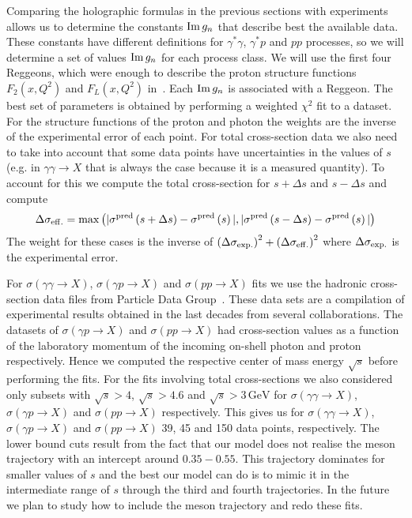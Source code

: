 \documentclass[preprint, 12pt]{elsarticle}
\begin{document}
Comparing the holographic formulas in the previous sections with experiments allows us to determine the constants ${\rm Im} \, g_n$ that describe best the available data. These constants have different definitions for $\gamma^*\gamma$, $\gamma^*p$ and $pp$ processes, so we will determine a set of values ${\rm Im} \, g_n$ for each process class. We will use the first four Reggeons, which were enough to describe the proton structure functions $F_2\left(x, Q^2\right)$ and $F_L\left(x, Q^2\right)$ in~\cite{gluonPDF_IHQCD_2020}. Each ${\rm Im} \, g_n$ is associated with a Reggeon. The best set of parameters is obtained by performing a weighted $\chi^2$ fit to a dataset. For the structure functions of the proton and photon the weights are the inverse of the experimental error of each point. For total cross-section data we also need to take into account that some data points have uncertainties in the values of $s$ (e.g. in $\gamma \gamma \rightarrow X$ that is always the case because it is a measured quantity). To account for this we compute the total cross-section for $s + \Delta s$ and $s - \Delta s$ and compute
\begin{equation}
\Delta \sigma_{\rm eff.} = {\rm max} \left(|\sigma^{\rm pred}\left(s + \Delta s\right)-\sigma^{\rm pred}\left(s\right)|,|\sigma^{\rm pred}\left(s - \Delta s\right)-\sigma^{\rm pred}\left(s\right)| \right)
\end{equation}
The weight for these cases is the inverse of ${\left(\Delta \sigma_{\rm exp.}\right)}^2+{\left(\Delta \sigma_{\rm eff.}\right)} ^2$ where $\Delta \sigma_{\rm exp.}$ is the experimental error.

For $\sigma\left(\gamma \gamma \rightarrow X\right)$,  $\sigma\left(\gamma p \rightarrow X\right)$ and $\sigma\left(p p \rightarrow X\right)$  fits we use the hadronic cross-section data files from Particle Data Group~\cite{pdg_2018}. These data sets are a compilation of experimental results obtained in the last decades from several collaborations. The datasets of  $\sigma\left(\gamma p \rightarrow X\right)$ and $\sigma\left(p p \rightarrow X\right)$ had cross-section values as a function of the laboratory momentum of the incoming on-shell photon and proton respectively. Hence we computed the respective center of mass energy $\sqrt{s}$ before performing the fits. For the fits involving total cross-sections we also considered only subsets with $\sqrt{s} > 4$, $\sqrt{s} > 4.6$ and $\sqrt{s} > 3 \, \text{GeV}$ for $\sigma\left(\gamma \gamma \rightarrow X\right)$, $\sigma\left(\gamma p \rightarrow X\right)$ and $\sigma\left(p p \rightarrow X \right)$ respectively. This gives us for $\sigma\left(\gamma \gamma \rightarrow X\right)$, $\sigma\left(\gamma p \rightarrow X\right)$ and $\sigma\left(p p \rightarrow X \right)$ 39, 45 and 150 data points, respectively.  The lower bound cuts result from the fact that our model does not realise the meson trajectory with an intercept around $0.35-0.55$. This trajectory dominates for smaller values of $s$ and the best our model can do is to mimic it in the intermediate range of $s$ through the third and fourth trajectories. In the future we plan to study how to include the meson trajectory and redo these fits.
\end{document}
